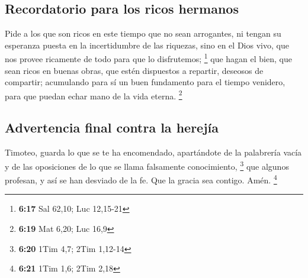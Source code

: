 \hypertarget{recordatorio-para-los-ricos-hermanos}{%
\subsection{Recordatorio para los ricos
hermanos}\label{recordatorio-para-los-ricos-hermanos}}

 Pide a los que son ricos en este tiempo que no sean
arrogantes, ni tengan su esperanza puesta en la incertidumbre de las
riquezas, sino en el Dios vivo, que nos provee ricamente de todo para
que lo disfrutemos; \footnote{\textbf{6:17} Sal 62,10; Luc 12,15-21}
 que hagan el bien, que sean ricos en buenas obras, que
estén dispuestos a repartir, deseosos de compartir; 
acumulando para sí un buen fundamento para el tiempo venidero, para que
puedan echar mano de la vida eterna. \footnote{\textbf{6:19} Mat 6,20;
  Luc 16,9}

\hypertarget{advertencia-final-contra-la-herejuxeda}{%
\subsection{Advertencia final contra la
herejía}\label{advertencia-final-contra-la-herejuxeda}}

 Timoteo, guarda lo que se te ha encomendado, apartándote
de la palabrería vacía y de las oposiciones de lo que se llama
falsamente conocimiento, \footnote{\textbf{6:20} 1Tim 4,7; 2Tim 1,12-14}
 que algunos profesan, y así se han desviado de la fe.
Que la gracia sea contigo. Amén. \footnote{\textbf{6:21} 1Tim 1,6; 2Tim
  2,18}
